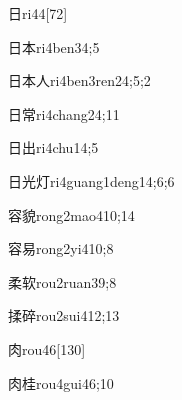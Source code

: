\begin{verbete}{日}{ri4}{4}[72]
\end{verbete}

\begin{verbete}{日本}{ri4ben3}{4;5}
\end{verbete}

\begin{verbete}{日本人}{ri4ben3ren2}{4;5;2}
\end{verbete}

\begin{verbete}{日常}{ri4chang2}{4;11}
\end{verbete}

\begin{verbete}{日出}{ri4chu1}{4;5}
\end{verbete}

\begin{verbete}{日光灯}{ri4guang1deng1}{4;6;6}
\end{verbete}

\begin{verbete}{容貌}{rong2mao4}{10;14}
\end{verbete}

\begin{verbete}{容易}{rong2yi4}{10;8}
\end{verbete}

\begin{verbete}{柔软}{rou2ruan3}{9;8}
\end{verbete}

\begin{verbete}{揉碎}{rou2sui4}{12;13}
\end{verbete}

\begin{verbete}{肉}{rou4}{6}[130]
\end{verbete}

\begin{verbete}{肉桂}{rou4gui4}{6;10}
\end{verbete}

